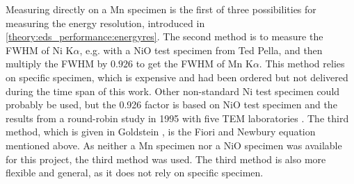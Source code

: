 Measuring directly on a Mn specimen is the first of three possibilities for measuring the energy resolution, introduced in \cref{theory:eds_performance:energyres}.
The second method is to measure the FWHM of Ni K$\alpha$, e.g. with a NiO test specimen from Ted Pella, and then multiply the FWHM by $0.926$ to get the FWHM of Mn K$\alpha$.
This method relies on specific specimen, which is expensive and had been ordered but not delivered during the time span of this work.
Other non-standard Ni test specimen could probably be used, but the 0.926 factor is based on NiO test specimen and the results from a round-robin study in 1995 with five TEM laboratories \cite{bennett_egerton_1995}.
The third method, which is given in Goldstein \cite{goldstein_scanning_2018}, is the Fiori and Newbury equation mentioned above.
As neither a Mn specimen nor a NiO specimen was available for this project, the third method was used.
The third method is also more flexible and general, as it does not rely on specific specimen.





